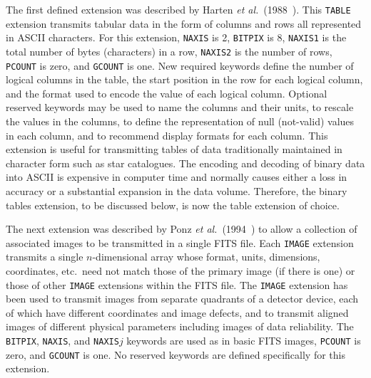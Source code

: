 \documentclass[twoside]{article}
\newcommand{\etal}{{\it et al.}}
\newcommand{\keyw}[1]{\hbox{{\tt #1}}}
\begin{document}
The first defined extension was described by Harten
\etal~(1988~\cite{HGGW88}).  This \keyw{TABLE} extension transmits
tabular data in the form of columns and rows all represented in ASCII
characters.  For this extension, \keyw{NAXIS} is 2, \keyw{BITPIX} is
8, \keyw{NAXIS1} is the total number of bytes (characters) in a row,
\keyw{NAXIS2} is the number of rows, \keyw{PCOUNT} is zero, and
\keyw{GCOUNT} is one.  New required keywords define the number of
logical columns in the table, the start position in the row for each
logical column, and the format used to encode the value of each
logical column.  Optional reserved keywords may be used to name the
columns and their units, to rescale the values in the columns, to
define the representation of null (not-valid) values in each column,
and to recommend display formats for each column.  This extension is
useful for transmitting tables of data traditionally maintained in
character form such as star catalogues.  The encoding and decoding of
binary data into ASCII is expensive in computer time and normally
causes either a loss in accuracy or a substantial expansion in the
data volume.  Therefore, the binary tables extension, to be discussed
below, is now the table extension of choice.

The next extension was described by Ponz \etal~(1994~\cite{PTM94}) to
allow a collection of associated images to be transmitted in a single
FITS file.  Each \keyw{IMAGE} extension transmits a single
$n$-dimensional array whose format, units, dimensions, coordinates,
etc.~need not match those of the primary image (if there is one) or
those of other \keyw{IMAGE} extensions within the FITS file.  The
\keyw{IMAGE} extension has been used to transmit images from separate
quadrants of a detector device, each of which have different
coordinates and image defects, and to transmit aligned images of
different physical parameters including images of data reliability.
The \keyw{BITPIX}, \keyw{NAXIS}, and \keyw{NAXIS$j$} keywords are used
as in basic FITS images, \keyw{PCOUNT} is zero, and \keyw{GCOUNT} is
one.  No reserved keywords are defined specifically for this
extension.
\end{document}
